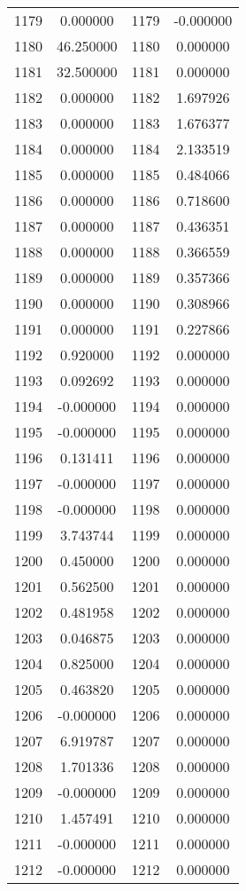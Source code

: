 \documentclass[12pt]{article}
\begin{document}
\begin{longtable}{@{}cccc@{}}
1179 & 0.000000 & 1179 & -0.000000 \\
1180 & 46.250000 & 1180 & 0.000000 \\
1181 & 32.500000 & 1181 & 0.000000 \\
1182 & 0.000000 & 1182 & 1.697926 \\
1183 & 0.000000 & 1183 & 1.676377 \\
1184 & 0.000000 & 1184 & 2.133519 \\
1185 & 0.000000 & 1185 & 0.484066 \\
1186 & 0.000000 & 1186 & 0.718600 \\
1187 & 0.000000 & 1187 & 0.436351 \\
1188 & 0.000000 & 1188 & 0.366559 \\
1189 & 0.000000 & 1189 & 0.357366 \\
1190 & 0.000000 & 1190 & 0.308966 \\
1191 & 0.000000 & 1191 & 0.227866 \\
1192 & 0.920000 & 1192 & 0.000000 \\
1193 & 0.092692 & 1193 & 0.000000 \\
1194 & -0.000000 & 1194 & 0.000000 \\
1195 & -0.000000 & 1195 & 0.000000 \\
1196 & 0.131411 & 1196 & 0.000000 \\
1197 & -0.000000 & 1197 & 0.000000 \\
1198 & -0.000000 & 1198 & 0.000000 \\
1199 & 3.743744 & 1199 & 0.000000 \\
1200 & 0.450000 & 1200 & 0.000000 \\
1201 & 0.562500 & 1201 & 0.000000 \\
1202 & 0.481958 & 1202 & 0.000000 \\
1203 & 0.046875 & 1203 & 0.000000 \\
1204 & 0.825000 & 1204 & 0.000000 \\
1205 & 0.463820 & 1205 & 0.000000 \\
1206 & -0.000000 & 1206 & 0.000000 \\
1207 & 6.919787 & 1207 & 0.000000 \\
1208 & 1.701336 & 1208 & 0.000000 \\
1209 & -0.000000 & 1209 & 0.000000 \\
1210 & 1.457491 & 1210 & 0.000000 \\
1211 & -0.000000 & 1211 & 0.000000 \\
1212 & -0.000000 & 1212 & 0.000000 \\

\end{longtable}
\end{document}
